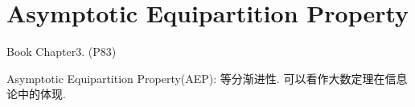 \chapter{Asymptotic Equipartition Property}

Book Chapter3. (P83)

Asymptotic Equipartition Property(AEP): 等分渐进性. 可以看作大数定理在信息论中的体现.





